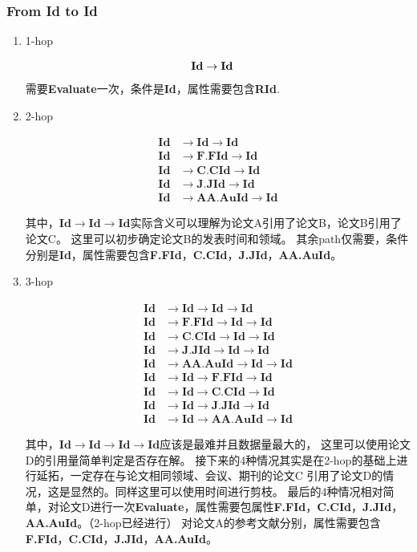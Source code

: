 \documentclass[hyperref,UTF8]{ctexart}
\theoremstyle{definition}
\theoremstyle{remark}
\numberwithin{equation}{subsection}
\newcommand{\Emph}{\textbf}
\newcommand{\resetcounter}{\setcounter{equation}{0}}
\newcommand{\Evaluate}{\Emph{Evaluate}}
\newcommand{\Id}{\Emph{Id}}
\newcommand{\RId}{\Emph{RId}}
\newcommand{\FFId}{\Emph{F.FId}}
\newcommand{\CCId}{\Emph{C.CId}}
\newcommand{\JJId}{\Emph{J.JId}}
\newcommand{\AAAuId}{\Emph{AA.AuId}}
\begin{document}
\subsubsection{From \Emph{Id} to \Emph{Id}}
\label{subsub:Id2Id}	

	\begin{enumerate}[(1)]
		
		\item 1-hop
		
		\begin{align}
		\resetcounter
			\Id &\rightarrow \Id
		\end{align}
		需要\Evaluate 一次，条件是\Id ，属性需要包含\RId.
		
		\item 2-hop
		
		\begin{align}
			\Id &\rightarrow \Id \rightarrow \Id	\\
			\Id &\rightarrow \FFId \rightarrow \Id	\\
			\Id &\rightarrow \CCId \rightarrow \Id	\\
			\Id &\rightarrow \JJId \rightarrow \Id	\\
			\Id &\rightarrow \AAAuId \rightarrow \Id
		\end{align}
		
		其中，$\Id \rightarrow \Id \rightarrow \Id$实际含义可以理解为论文A引用了论文B，论文B引用了论文C。
		这里可以初步确定论文B的发表时间和领域。
		其余path仅需要，条件分别是\Id，属性需要包含\FFId，\CCId，\JJId，\AAAuId。
		
		\item 3-hop
		
		\begin{align}
			\Id &\rightarrow \Id 	\rightarrow 	\Id	\rightarrow \Id	\\
			\Id &\rightarrow \FFId 	\rightarrow 	\Id	\rightarrow \Id	\\
			\Id &\rightarrow \CCId 	\rightarrow 	\Id	\rightarrow \Id	\\
			\Id &\rightarrow \JJId 	\rightarrow 	\Id	\rightarrow \Id	\\
			\Id &\rightarrow \AAAuId \rightarrow 	\Id	\rightarrow \Id	\\
			\Id &\rightarrow \Id 	\rightarrow	\FFId \rightarrow \Id	\\
			\Id &\rightarrow \Id 	\rightarrow	\CCId \rightarrow \Id	\\
			\Id &\rightarrow \Id 	\rightarrow	\JJId \rightarrow \Id	\\
			\Id &\rightarrow \Id 	\rightarrow	\AAAuId \rightarrow \Id
		\end{align}
		
		其中，$\Id \rightarrow \Id \rightarrow \Id \rightarrow \Id$应该是最难并且数据量最大的，
		这里可以使用论文D的引用量简单判定是否存在解。
		接下来的4种情况其实是在2-hop的基础上进行延拓，一定存在与论文相同领域、会议、期刊的论文C
		引用了论文D的情况，这是显然的。同样这里可以使用时间进行剪枝。
		最后的4种情况相对简单，对论文D进行一次\Evaluate，属性需要包属性\FFId，\CCId，\JJId，\AAAuId。（2-hop已经进行）
		对论文A的参考文献分别，属性需要包含\FFId，\CCId，\JJId，\AAAuId。
		
	\end{enumerate}
	
\end{document}
